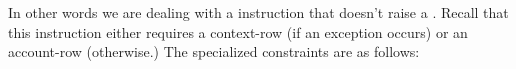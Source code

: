 
\begin{center}
\end{center}
In other words we are dealing with a  instruction that doesn't raise a \suxSH{}.
Recall that this instruction either requires a context-row (if an exception occurs) or an account-row (otherwise.)
The specialized constraints are as follows:
